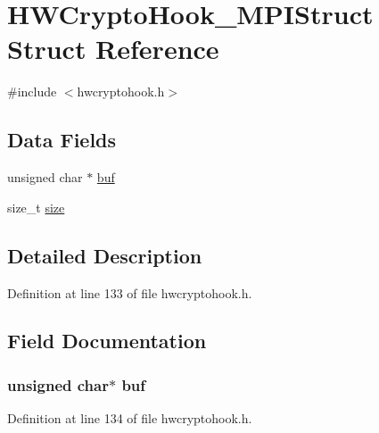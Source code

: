 \hypertarget{struct_h_w_crypto_hook___m_p_i_struct}{}\section{H\+W\+Crypto\+Hook\+\_\+\+M\+P\+I\+Struct Struct Reference}
\label{struct_h_w_crypto_hook___m_p_i_struct}


{\ttfamily \#include $<$hwcryptohook.\+h$>$}

\subsection*{Data Fields}
\begin{DoxyCompactItemize}
\item 
unsigned char $\ast$ \hyperlink{struct_h_w_crypto_hook___m_p_i_struct_ac8ed9b9edf72a0bbde1ba01f0c67ef73}{buf}
\item 
size\+\_\+t \hyperlink{struct_h_w_crypto_hook___m_p_i_struct_a854352f53b148adc24983a58a1866d66}{size}
\end{DoxyCompactItemize}


\subsection{Detailed Description}


Definition at line 133 of file hwcryptohook.\+h.



\subsection{Field Documentation}
\subsubsection[{\texorpdfstring{buf}{buf}}]{\setlength{\rightskip}{0pt plus 5cm}unsigned char$\ast$ buf}\hypertarget{struct_h_w_crypto_hook___m_p_i_struct_ac8ed9b9edf72a0bbde1ba01f0c67ef73}{}\label{struct_h_w_crypto_hook___m_p_i_struct_ac8ed9b9edf72a0bbde1ba01f0c67ef73}


Definition at line 134 of file hwcryptohook.\+h.

